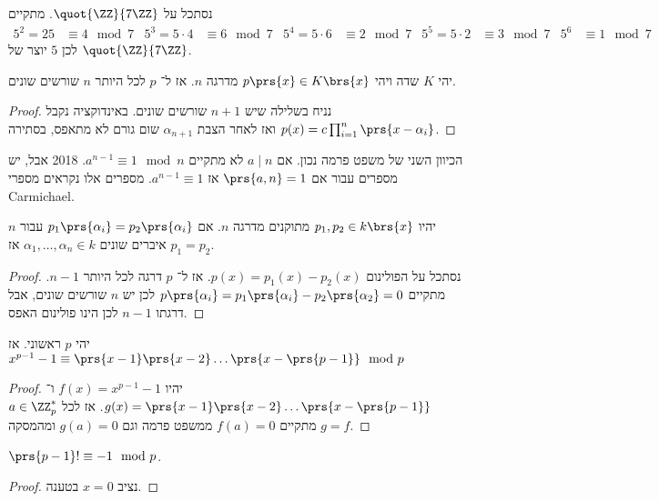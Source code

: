 \documentclass[a4paper,10pt,twoside,openany]{book}
\begin{document}
\begin{example}
נסתכל על
$\quot{\ZZ}{7\ZZ}$.
מתקיים
\begin{align*}
5^2 = 25 &\equiv 4 \mod{7} & 5^3 = 5\cdot 4 &\equiv 6\mod{7} & 5^4 = 5\cdot 6 &\equiv 2\mod{7} & 5^5 = 5\cdot 2 &\equiv 3\mod{7} & 5^6 &\equiv 1\mod{7}
\end{align*}
לכן
$5$
יוצר של
$\quot{\ZZ}{7\ZZ}$.
\end{example}

\begin{lemma}
יהי
$K$
שדה ויהי
$p\prs{x} \in K\brs{x}$
מדרגה
$n$.
אז ל־%
$p$
לכל היותר
$n$
שורשים שונים.
\end{lemma}
\begin{proof}
נניח בשלילה שיש
$n+1$
שורשים שונים. באינדוקציה נקבל
$p(x) = c \prod_{i=1}^n \prs{x-\alpha_i}$
ואז לאחר הצבת
$\alpha_{n+1}$
שום גורם לא מתאפס, בסתירה.
\end{proof}
\begin{remark}
הכיוון השני של משפט פרמה נכון. אם
$a \mid n$
לא מתקיים
$a^{n-1} \equiv 1 \mod{n}$.%
%
{2018}
אבל,
יש מספרים עבור
אם
$\prs{a,n} = 1$
אז
$a^{n-1}\equiv 1$.
מספרים אלו נקראים מספרי
\textenglish{Carmichael}.
\end{remark}
\begin{corollary}
יהיו
$p_1,p_2 \in k\brs{x}$
מתוקנים מדרגה
$n$.
אם
$p_1\prs{\alpha_i} = p_2\prs{\alpha_i}$
עבור
$n$
איברים שונים
$\alpha_1, \ldots, \alpha_n \in k$
אז
$p_1 = p_2$.
\end{corollary}
\begin{proof}
נסתכל על הפולינום
$p(x) = p_1(x) - p_2(x)$.
אז ל־%
$p$
דרגה לכל היותר
$n-1$.
מתקיים
$p\prs{\alpha_i} = p_1\prs{\alpha_i} - p_2\prs{\alpha_2} = 0$
לכן יש
$n$
שורשים שונים, אבל דרגתו
$n-1$
לכן הינו פולינום האפס.
\end{proof}
\begin{proposition}
יהי
$p$
ראשוני. אז
$x^{p-1}-1 \equiv \prs{x-1}\prs{x-2}\ldots\prs{x-\prs{p-1}} \mod{p}$
\end{proposition}
\begin{proof}
יהיו
$f(x) = x^{p-1}-1$
ו־%
$g(x) = \prs{x-1}\prs{x-2}\ldots\prs{x-\prs{p-1}}$.
אז לכל
$a \in \ZZ_p^*$
מתקיים
$f(a) = 0$
ממשפט פרמה וגם
$g(a) = 0$
ומהמסקה
$g = f$.
\end{proof}
\begin{theorem}
$\prs{p-1}! \equiv -1\mod{p}$.
\end{theorem}
\begin{proof}
נציב
$x=0$
בטענה.
\end{proof}
\end{document}
